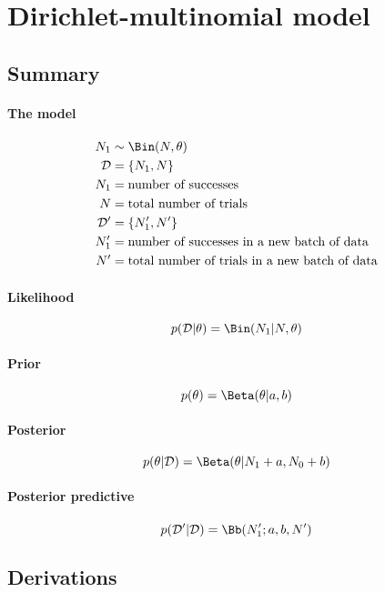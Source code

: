 \section{Dirichlet-multinomial model}
\subsection{Summary}
\paragraph{The model}
    \begin{align}
        N_1         &\sim \Bin(N, \theta) \\
        \mathcal D  &= \{N_1, N\} \\
        N_1         &= \text{number of successes} \\
        N           &= \text{total number of trials} \\
        \mathcal D' &= \{N_1', N'\} \\
        N_1'        &= \text{number of successes in a new batch of data} \\
        N'          &= \text{total number of trials in a new batch of data}
    \end{align}

\paragraph{Likelihood}
    \begin{equation}
        p(\mathcal D | \theta) = \Bin(N_1 | N, \theta)
    \end{equation}

\paragraph{Prior}
    \begin{equation}
        p(\theta)   = \Beta(\theta | a, b)
    \end{equation}

\paragraph{Posterior}
    \begin{equation}
        p(\theta | \mathcal D) = \Beta(\theta | N_1 + a, N_0 + b)
    \end{equation}

\paragraph{Posterior predictive}
    \begin{equation}
        p(\mathcal D' | \mathcal D) = \Bb(N_1'; a, b, N')
    \end{equation}

\subsection{Derivations}